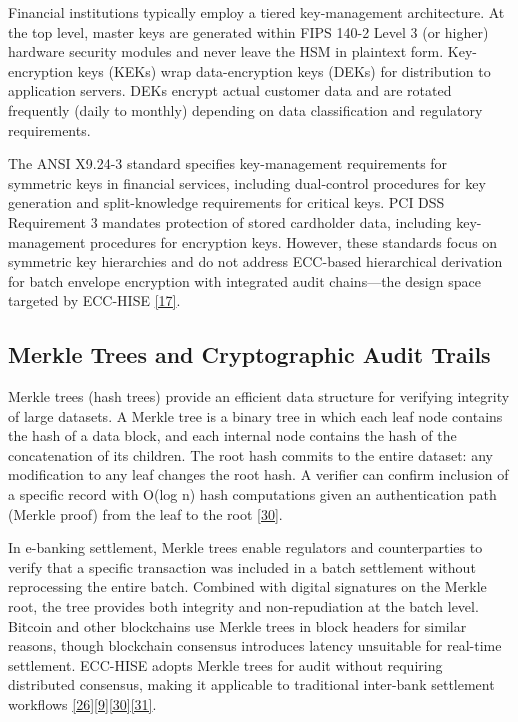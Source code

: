 \indent Financial institutions typically employ a tiered key-management architecture. At the top level, master keys are generated within FIPS 140-2 Level 3 (or higher) hardware security modules and never leave the HSM in plaintext form. Key-encryption keys (KEKs) wrap data-encryption keys (DEKs) for distribution to application servers. DEKs encrypt actual customer data and are rotated frequently (daily to monthly) depending on data classification and regulatory requirements.

\indent The ANSI X9.24-3 standard specifies key-management requirements for symmetric keys in financial services, including dual-control procedures for key generation and split-knowledge requirements for critical keys. PCI DSS Requirement 3 mandates protection of stored cardholder data, including key-management procedures for encryption keys. However, these standards focus on symmetric key hierarchies and do not address ECC-based hierarchical derivation for batch envelope encryption with integrated audit chains---the design space targeted by ECC-HISE \hyperref[ref:17]{[17]}.

\subsection{Merkle Trees and Cryptographic Audit Trails}

\indent Merkle trees (hash trees) provide an efficient data structure for verifying integrity of large datasets. A Merkle tree is a binary tree in which each leaf node contains the hash of a data block, and each internal node contains the hash of the concatenation of its children. The root hash commits to the entire dataset: any modification to any leaf changes the root hash. A verifier can confirm inclusion of a specific record with O(log n) hash computations given an authentication path (Merkle proof) from the leaf to the root \hyperref[ref:30]{[30]}.

\indent In e-banking settlement, Merkle trees enable regulators and counterparties to verify that a specific transaction was included in a batch settlement without reprocessing the entire batch. Combined with digital signatures on the Merkle root, the tree provides both integrity and non-repudiation at the batch level. Bitcoin and other blockchains use Merkle trees in block headers for similar reasons, though blockchain consensus introduces latency unsuitable for real-time settlement. ECC-HISE adopts Merkle trees for audit without requiring distributed consensus, making it applicable to traditional inter-bank settlement workflows \hyperref[ref:26]{[26]}\hyperref[ref:9]{[9]}\hyperref[ref:30]{[30]}\hyperref[ref:31]{[31]}.

